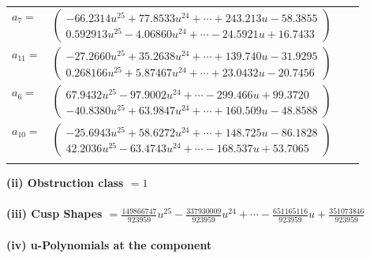 \documentclass[1p]{elsarticle_modified}
\theoremstyle{definition}
\begin{document}
\begin{tabular}{m{7pt} m{180pt} m{7pt} m{180pt} }
\flushright $a_{7}=$&$\begin{pmatrix}-66.2314 u^{25}+77.8533 u^{24}+\cdots+243.213 u-58.3855\\0.592913 u^{25}-4.06860 u^{24}+\cdots-24.5921 u+16.7433\end{pmatrix}$ \\
\flushright $a_{11}=$&$\begin{pmatrix}-27.2660 u^{25}+35.2638 u^{24}+\cdots+139.740 u-31.9295\\0.268166 u^{25}+5.87467 u^{24}+\cdots+23.0432 u-20.7456\end{pmatrix}$ \\
\flushright $a_{6}=$&$\begin{pmatrix}67.9432 u^{25}-97.9002 u^{24}+\cdots-299.466 u+99.3720\\-40.8380 u^{25}+63.9847 u^{24}+\cdots+160.509 u-48.8588\end{pmatrix}$ \\
\flushright $a_{10}=$&$\begin{pmatrix}-25.6943 u^{25}+58.6272 u^{24}+\cdots+148.725 u-86.1828\\42.2036 u^{25}-63.4743 u^{24}+\cdots-168.537 u+53.7065\end{pmatrix}$\\&\end{tabular}
\flushleft \textbf{(ii) Obstruction class $= 1$}\\~\\
\flushleft \textbf{(iii) Cusp Shapes $= \frac{149866747}{923959} u^{25}-\frac{337930009}{923959} u^{24}+\cdots-\frac{651165116}{923959} u+\frac{351073846}{923959}$}\\~\\
\newpage\renewcommand{\arraystretch}{1}
\flushleft \textbf{(iv) u-Polynomials at the component}\newline \\
\end{document}
